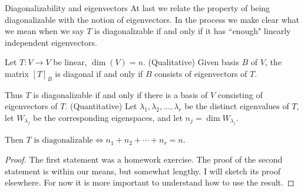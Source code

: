 \begin{frame}{Diagonalizability and eigenvectors}
At last we relate the property of being diagonalizable with the notion of eigenvectors. In the process we make clear what we mean when we say $T$ is diagonalizable if and only if it has ``enough" linearly independent eigenvectors. 
\pause
\begin{theorem}\label{th:diagonalizability}
Let $T\colon V\rightarrow V$ be linear, $\dim(V)=n$.
\bb
\ii (\alert{Qualitative}) Given basis $B$ of $V$, the matrix $[T]_B$ is diagonal if and only if $B$ consists of eigenvectors of $T$. 

Thus $T$ is diagonalizable if and only if there is a basis of $V$ consisting of eigenvectors of $T$. 
\ii (\alert{Quantitative}) Let $\lambda_1, \lambda_2, \dots, \lambda_r$ be the \alert{distinct} eigenvalues of $T$, let $W_{\lambda_j}$ be the corresponding eigenspaces, and let $n_j=\dim W_{\lambda_j}$. 

Then $T \text{ is diagonalizable}\Longleftrightarrow n_1+n_2+\cdots +n_r=n$.
\ee
\end{theorem}
\pause
\begin{proof}
The first statement was a homework exercise. The proof of the second statement is within our means, but somewhat lengthy. I will sketch its proof elsewhere.  For now it is more important to understand how to use the result. 
\end{proof}
\end{frame}

